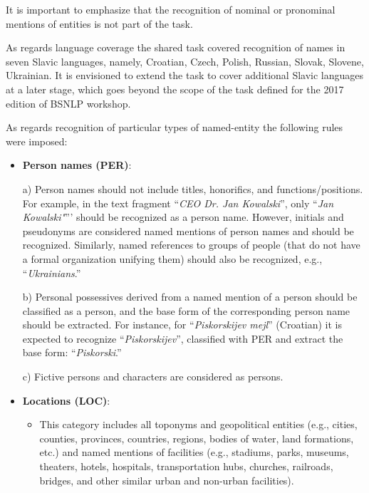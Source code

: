 \documentclass[11pt]{article}
\begin{document}
It is important to emphasize that the recognition of nominal or pronominal mentions of entities is not part of the task. 

As regards language coverage the shared task covered recognition of names in seven Slavic languages, namely, Croatian, 
Czech, Polish, Russian, Slovak, Slovene, Ukrainian. It is envisioned to extend the task to cover additional Slavic 
languages at a later stage, which goes beyond the scope of the task defined for the 2017 edition of BSNLP workshop.

As regards recognition of particular types of named-entity the following rules were imposed:

\begin{itemize}

\item \textbf{Person names (PER)}:

  a) Person names should not include titles, honorifics, and functions/positions. For example, in the text fragment ``\textit{CEO Dr. Jan Kowalski}'', only ``\textit{Jan Kowalski"}''' should be recognized as a person name. However, initials and pseudonyms are considered named mentions of person names and should be recognized. Similarly, named references to groups of people (that do not have a formal organization unifying them) should also be recognized, e.g., ``\textit{Ukrainians}.''

  b) Personal possessives derived from a named mention of a person should
  be classified as a person, and the base form of the corresponding
  person name should be extracted. For instance, for
  ``\textit{Piskorskijev mejl}'' (Croatian) it is expected to recognize
  ``\textit{Piskorskijev}'', classified with PER and extract the base
  form: ``\textit{Piskorski}.''

  c) Fictive persons and characters are considered as persons.

\item \textbf{Locations (LOC)}:

  \begin{itemize}

  \item This category includes all toponyms and geopolitical entities
    (e.g., cities, counties, provinces, countries, regions, bodies of
    water, land formations, etc.) and named mentions of facilities (e.g.,
    stadiums, parks, museums, theaters, hotels, hospitals, transportation
    hubs, churches, railroads, bridges, and other similar urban and
    non-urban facilities).


\end{itemize}
\end{itemize}
\end{document}
